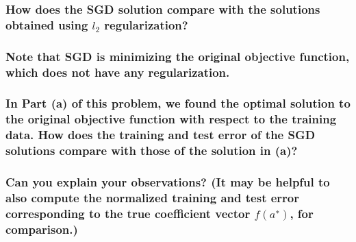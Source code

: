 \documentclass[11pt]{article}
\begin{document}
\subsubsection{\texorpdfstring{How does the SGD solution compare with
the solutions obtained using \(l_2\)
regularization?}{How does the SGD solution compare with the solutions obtained using l\_2 regularization?}}\label{how-does-the-sgd-solution-compare-with-the-solutions-obtained-using-l_2-regularization}

\subsubsection{Note that SGD is minimizing the original objective
function, which does not have any
regularization.}\label{note-that-sgd-is-minimizing-the-original-objective-function-which-does-not-have-any-regularization.}

\subsubsection{In Part (a) of this problem, we found the optimal
solution to the original objective function with respect to the training
data. How does the training and test error of the SGD solutions compare
with those of the solution in
(a)?}\label{in-part-a-of-this-problem-we-found-the-optimal-solution-to-the-original-objective-function-with-respect-to-the-training-data.-how-does-the-training-and-test-error-of-the-sgd-solutions-compare-with-those-of-the-solution-in-a}

\subsubsection{\texorpdfstring{Can you explain your observations? (It
may be helpful to also compute the normalized training and test error
corresponding to the true coefficient vector \(f(a^∗)\), for
comparison.)}{Can you explain your observations? (It may be helpful to also compute the normalized training and test error corresponding to the true coefficient vector f(a\^{}∗), for comparison.)}}\label{can-you-explain-your-observations-it-may-be-helpful-to-also-compute-the-normalized-training-and-test-error-corresponding-to-the-true-coefficient-vector-fa-for-comparison.}

    \protect\hypertarget{jump}{}{}
\end{document}

